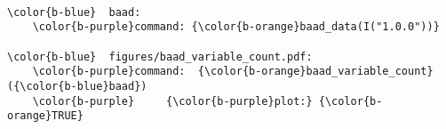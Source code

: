 \documentclass[class=minimal,border=0]{standalone}
\begin{document}
%
\begin{BVerbatim}[bgcolor=b-darkgrey]

\color{b-blue}  baad:
    \color{b-purple}command: {\color{b-orange}baad_data(I("1.0.0"))}

\color{b-blue}  figures/baad_variable_count.pdf:
    \color{b-purple}command:  {\color{b-orange}baad_variable_count}({\color{b-blue}baad})
    \color{b-purple}     {\color{b-purple}plot:} {\color{b-orange}TRUE}

\end{BVerbatim}
\end{document}
